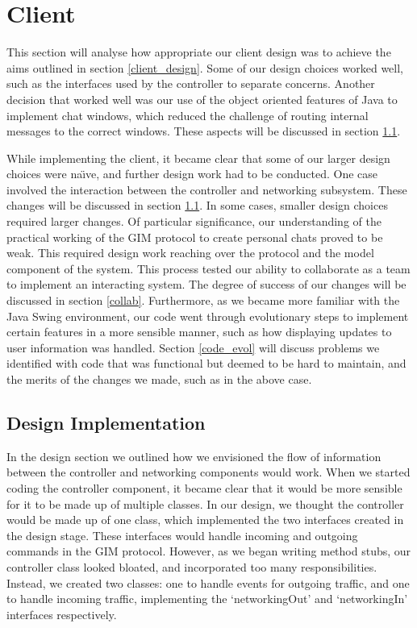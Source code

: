 \section{Client}
\label{clientimpl}

This section will analyse how appropriate our client design was to achieve the aims outlined in section \ref{client_design}. Some of our design choices worked well, such as the interfaces used by the controller to separate concerns. Another decision that worked well was our use of the object oriented features of Java to implement chat windows, which reduced the challenge of routing internal messages to the correct windows. These aspects will be discussed in section \ref{designimpl}.

While implementing the client, it became clear that some of our larger design choices were na\"{\i}ve, and further design work had to be conducted. One case involved the interaction between the controller and networking subsystem. These changes will be discussed in section \ref{designimpl}. In some cases, smaller design choices required larger changes. Of particular significance, our understanding of the practical working of the GIM protocol to create personal chats proved to be weak. This required design work reaching over the protocol and the model component of the system. This process tested our ability to collaborate as a team to implement an interacting system. The degree of success of our changes will be discussed in section \ref{collab}. Furthermore, as we became more familiar with the Java Swing environment, our code went through evolutionary steps to implement certain features in a more sensible manner, such as how displaying updates to user information was handled. Section \ref{code_evol} will discuss problems we identified with code that was functional but deemed to be hard to maintain, and the merits of the changes we made, such as in the above case.

\subsection{Design Implementation}
\label{designimpl}

In the design section we outlined how we envisioned the flow of information between the controller and networking components would work. When we started coding the controller component, it became clear that it would be more sensible for it to be made up of multiple classes. In our design, we thought the controller would be made up of one class, which implemented the two interfaces created in the design stage. These interfaces would handle incoming and outgoing commands in the GIM protocol. However, as we began writing method stubs, our controller class looked bloated, and incorporated too many responsibilities. Instead, we created two classes: one to handle events for outgoing traffic, and one to handle incoming traffic, implementing the `networkingOut' and `networkingIn' interfaces respectively.


